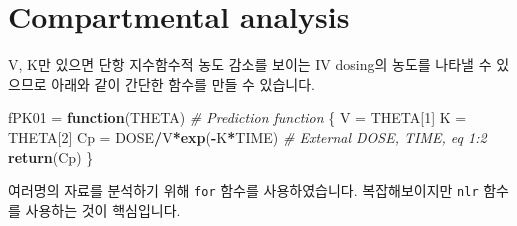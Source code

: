 \documentclass[9pt,]{krantz}
\newenvironment{Shaded}{\begin{snugshade}}{\end{snugshade}}
\newcommand{\KeywordTok}[1]{\textcolor[rgb]{0.13,0.29,0.53}{\textbf{#1}}}
\newcommand{\DecValTok}[1]{\textcolor[rgb]{0.00,0.00,0.81}{#1}}
\newcommand{\StringTok}[1]{\textcolor[rgb]{0.31,0.60,0.02}{#1}}
\newcommand{\CommentTok}[1]{\textcolor[rgb]{0.56,0.35,0.01}{\textit{#1}}}
\newcommand{\ControlFlowTok}[1]{\textcolor[rgb]{0.13,0.29,0.53}{\textbf{#1}}}
\newcommand{\OperatorTok}[1]{\textcolor[rgb]{0.81,0.36,0.00}{\textbf{#1}}}
\newcommand{\NormalTok}[1]{#1}
\begin{document}
\section{Compartmental analysis}\label{compartmental-analysis}

V, K만 있으면 단항 지수함수적 농도 감소를 보이는 IV dosing의 농도를
나타낼 수 있으므로 아래와 같이 간단한 함수를 만들 수 있습니다.

\begin{Shaded}
\begin{Highlighting}[]
\NormalTok{fPK01 =}\StringTok{ }\ControlFlowTok{function}\NormalTok{(THETA) }\CommentTok{# Prediction function}
\NormalTok{\{}
\NormalTok{  V  =}\StringTok{ }\NormalTok{THETA[}\DecValTok{1}\NormalTok{]}
\NormalTok{  K  =}\StringTok{ }\NormalTok{THETA[}\DecValTok{2}\NormalTok{]}
\NormalTok{  Cp =}\StringTok{ }\NormalTok{DOSE}\OperatorTok{/}\NormalTok{V}\OperatorTok{*}\KeywordTok{exp}\NormalTok{(}\OperatorTok{-}\NormalTok{K}\OperatorTok{*}\NormalTok{TIME)  }\CommentTok{# External DOSE, TIME, eq 1:2}
  \KeywordTok{return}\NormalTok{(Cp)}
\NormalTok{\}}
\end{Highlighting}
\end{Shaded}

여러명의 자료를 분석하기 위해 \texttt{for} 함수를 사용하였습니다.
복잡해보이지만 \texttt{nlr} 함수를 사용하는 것이 핵심입니다.
\end{document}
